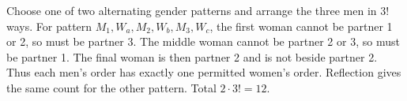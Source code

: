 Choose one of two alternating gender patterns and arrange the three men in $3!$ ways. For pattern $M_1,W_a,M_2,W_b,M_3,W_c$, the first woman cannot be partner 1 or 2, so must be partner 3. The middle woman cannot be partner 2 or 3, so must be partner 1. The final woman is then partner 2 and is not beside partner 2. Thus each men's order has exactly one permitted women's order. Reflection gives the same count for the other pattern. Total $2\cdot3!=\boxed{12}$.
